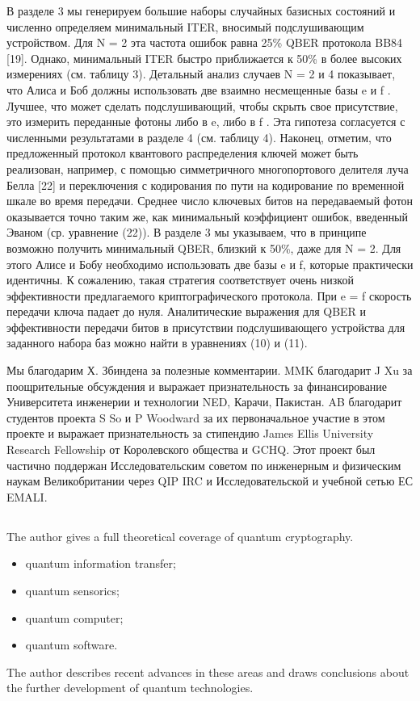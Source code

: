 В разделе 3 мы генерируем большие наборы случайных базисных состояний и численно определяем минимальный ITER, вносимый подслушивающим устройством. Для N = 2 эта частота ошибок равна 25\% QBER протокола BB84 [19]. Однако, минимальный ITER быстро приближается к 50\% в более высоких измерениях (см. таблицу 3). Детальный анализ случаев N = 2 и 4 показывает, что Алиса и Боб должны использовать две взаимно несмещенные базы e и f . Лучшее, что может сделать подслушивающий, чтобы скрыть свое присутствие, это измерить переданные фотоны либо в e, либо в f . Эта гипотеза согласуется с численными результатами в разделе 4 (см. таблицу 4). Наконец, отметим, что предложенный протокол квантового распределения ключей может быть реализован, например, с помощью симметричного многопортового делителя луча Белла [22] и переключения с кодирования по пути на кодирование по временной шкале во время передачи. Среднее число ключевых битов на передаваемый фотон оказывается точно таким же, как минимальный коэффициент ошибок, введенный Эваном (ср. уравнение (22)).
В разделе 3 мы указываем, что в принципе возможно получить минимальный QBER, близкий к 50\%, даже для N = 2. Для этого Алисе и Бобу необходимо использовать две базы e и f, которые практически идентичны. К сожалению, такая стратегия соответствует очень низкой эффективности предлагаемого криптографического протокола. При e = f скорость передачи ключа падает до нуля. Аналитические выражения для QBER и эффективности передачи битов в присутствии подслушивающего устройства для заданного набора баз можно найти в уравнениях (10) и (11).

Мы благодарим Х. Збиндена за полезные комментарии. MMK благодарит J Xu за поощрительные обсуждения и выражает признательность за финансирование Университета инженерии и технологии NED, Карачи, Пакистан. AB благодарит студентов проекта S So и P Woodward за их первоначальное участие в этом проекте и выражает признательность за стипендию James Ellis University Research Fellowship от Королевского общества и GCHQ. Этот проект был частично поддержан Исследовательским советом по инженерным и физическим наукам Великобритании через QIP IRC и Исследовательской и учебной сетью ЕС EMALI.
\subsection{\review}
The author gives a full theoretical coverage of quantum cryptography.
\begin{itemize}
	\item quantum information transfer;
	\item quantum sensorics;
	\item quantum computer;
	\item quantum software.
\end{itemize}
The author describes recent advances in these areas and draws conclusions about the further development of quantum technologies.


\subsection{\dic}

